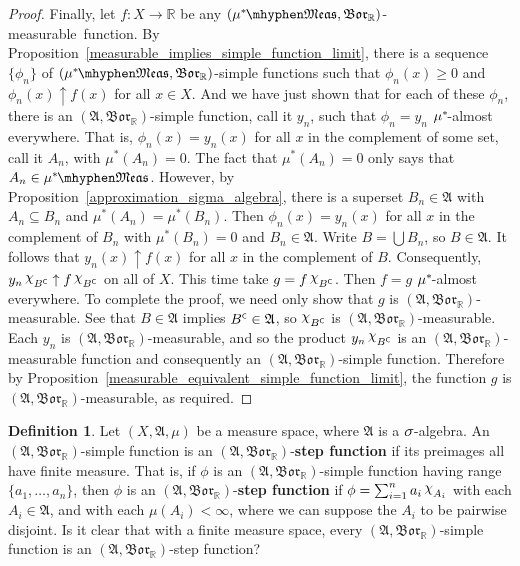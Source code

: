 \documentclass[
twoside=true,
paper=letter,
fontsize=9pt,
pagesize=auto,
leqno,
openany,
headsepline,
overfullrule,
]{scrbook}
\theoremstyle{plain}
\theoremstyle{plain}
\theoremstyle{definition}
\newtheorem{defn}[thm]{Definition}
\theoremstyle{bfnoteitalic}
\theoremstyle{bfnoteroman}
\newcommand{\term}[1]{\textbf{#1}\index{#1}}
\newcommand{\sigalg}[1]{\mathfrak{#1}}
\newcommand{\borel}{\mathfrak{Bor}}
\newcommand{\textsigma}{\hbox{\large{$\sigma$}}\kern-1pt}
\newcommand{\charfunction}[1]{\mathop{{\raisebox{2pt}{$\chi$}}_{#1}}}
\newcommand{\comp}{^{\hbox{\tiny{$\mathsf C$}}}}
\newcommand{\R}{\mathbb{R}}
\newcommand{\sigmaalgebra}{\sigalg{A}}
\newcommand{\measurable}[1]{{#1}\mhyphen\mathfrak{Meas}}
\newcommand{\kernast}{\ast\kern-1pt}
\newcommand{\mbmeasurable}{$(\measurable{\measure^\kernast},\borel_\R)$\hyp{}measurable}
\newcommand{\measurespace}{X}
\newcommand{\mspaceeltii}{y}
\newcommand{\measure}{\mu}
\newcommand{\measmu}{\mu}
\newcommand{\seti}{A}
\begin{document}
\begin{proof}
Finally, let $f:\measurespace\to\R$ be any \mbmeasurable\ function.
By Proposition~\ref{measurable_implies_simple_function_limit}, there is a sequence $\{ \phi_n \}$ of $(\measurable{\measure^\kernast},\borel_\R)$-simple functions such that $\phi_n(x)\geq 0$ and $\phi_n(x)\uparrow f(x)$ for all $x\in\measurespace$.
And we have just shown that for each of these $\phi_n$, there is an $(\sigmaalgebra,\borel_\R)$-simple function, call it $\mspaceeltii_n$, such that $\phi_n = \mspaceeltii_n$  $\measure^\kernast$-almost everywhere. That is, $\phi_n(x) = \mspaceeltii_n(x)$ for all $x$ in the complement of some set, call it $A_n$, with $\measure^*(A_n) = 0$. 
The fact that $\measure^*(A_n)=0$ only says that $A_n\in\measurable{\measure^\kernast}$.
However, by Proposition~\ref{approximation_sigma_algebra}, there is a superset $B_n\in \sigmaalgebra$ with $A_n\subseteq B_n$ and $\measure^*(A_n) = \measure^*(B_n)$.
Then $\phi_n(x) = \mspaceeltii_n(x)$ for all $x$ in the complement of $B_n$ with $\measure^*(B_n) = 0$ and $B_n\in\sigmaalgebra$. 
Write $B=\bigcup B_n$, so $B\in\sigmaalgebra$.  
It follows that $\mspaceeltii_n(x) \uparrow f(x)$ for all $x$ in the complement of $B$. Consequently, $\mspaceeltii_n \charfunction{B\comp} \uparrow f \charfunction{B\comp}$ on all of $\measurespace$. This time take $g=f \charfunction{B\comp}$. Then $f = g$ $\measure^\kernast$-almost everywhere. To complete the proof, we need only show that $g$ is $(\sigmaalgebra,\borel_\R)$\hyp{}measurable. See that $B\in\sigmaalgebra$ implies $B\comp\in\sigmaalgebra$, so $\charfunction{B\comp}$ is $(\sigmaalgebra,\borel_\R)$\hyp{}measurable. Each $\mspaceeltii_n$ is $(\sigmaalgebra,\borel_\R)$\hyp{}measurable, and so the product $\mspaceeltii_n \charfunction{B\comp}$ is an $(\sigmaalgebra,\borel_\R)$\hyp{}measurable function and consequently an $(\sigmaalgebra,\borel_\R)$-simple function. Therefore by Proposition~\ref{measurable_equivalent_simple_function_limit}, the function $g$ is $(\sigmaalgebra,\borel_\R)$\hyp{}measurable, as required.
\end{proof}




\begin{defn}\label{step_function}
Let $(\measurespace,\sigmaalgebra, \measmu)$ be a measure space, where $\sigmaalgebra$ is a
$\textsigma$\hyp{}algebra.
An
$(\sigmaalgebra, \borel_\R)$\hyp{}simple
function is an
$(\sigmaalgebra,\borel_\R)$\hyp{}\term{step function} if its preimages all have finite measure.  That is,  if $\phi$ is an
$(\sigmaalgebra, \borel_\R)$\hyp{}simple function
having range
$\{a_1, \ldots, a_n\}$, then
$\phi$ is an $(\sigmaalgebra,\borel_\R)$\hyp{}\term{step function} if
$\phi=\sum_{i=1}^n a_i\charfunction{\seti_i}$ with each
$\seti_i \in \sigmaalgebra$, and with each $\measmu(A_i) < \infty$,
where we can suppose the $A_i$ to be pairwise disjoint.
Is it clear that with a finite measure space,
every
$(\sigmaalgebra, \borel_\R)$\hyp{}simple
function is an
$(\sigmaalgebra, \borel_\R)$\hyp{}step function?
\end{defn}
\end{document}
